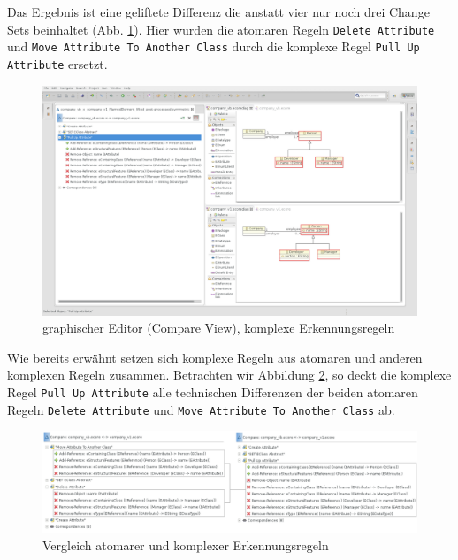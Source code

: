 \documentclass[a4paper]{scrartcl}
\begin{document}
Das Ergebnis ist eine geliftete Differenz die anstatt vier nur noch drei Change Sets beinhaltet  (Abb. \ref{silift-tutorial_compare_compare_view_complex}).
Hier wurden die atomaren Regeln \texttt{Delete Attribute} und \texttt{Move Attribute To Another Class} durch die komplexe Regel \texttt{Pull Up Attribute} ersetzt.

\begin{figure}[H]
\centering
\includegraphics[width=\textwidth]{graphics/silift-tutorial_compare_compare_view_complex.png}
\caption{graphischer Editor (Compare View), komplexe Erkennungsregeln}
\label{silift-tutorial_compare_compare_view_complex}
\end{figure}

Wie bereits erwähnt setzen sich komplexe Regeln aus atomaren und anderen komplexen Regeln zusammen.
Betrachten wir Abbildung \ref{silift-tutorial_compare_atomic_vs_complex}, so deckt die komplexe Regel \texttt{Pull Up Attribute} alle technischen Differenzen der beiden atomaren Regeln \texttt{Delete Attribute} und \texttt{Move Attribute To Another Class} ab.

\begin{figure}[H]
\centering
\includegraphics[width=\textwidth]{graphics/silift-tutorial_compare_atomic_vs_complex.png}
\caption{Vergleich atomarer und komplexer Erkennungsregeln}
\label{silift-tutorial_compare_atomic_vs_complex}
\end{figure}
\end{document}
